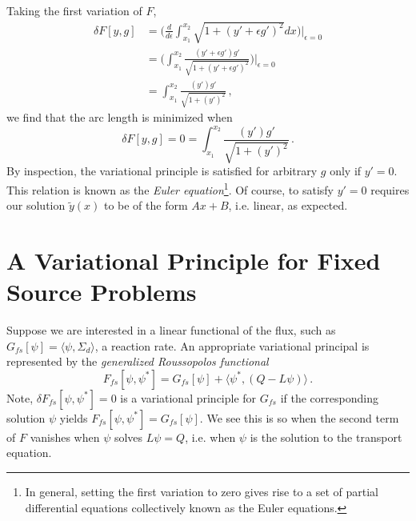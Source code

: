 Taking the first variation of $F$,
\begin{equation}
\begin{split}
\delta F[y,g] &= \Big ( \frac{d}{d\epsilon}\int^{x_2}_{x_1} \sqrt{1 + (y'+\epsilon g')^2} dx  \Big ) \Big |_{\epsilon=0} \\
              &=  \Bigg ( \int^{x_2}_{x_1} \frac{(y'+\epsilon g')g'}{\sqrt{1 + (y'+\epsilon g')^2}}  \Bigg ) \Bigg |_{\epsilon=0} \\
              &= \int^{x_2}_{x_1} \frac{(y')g'}{\sqrt{1 + (y')^2}}  \, ,
\end{split}
\end{equation}
we find that the arc length is minimized when
\begin{equation}
\delta F[y,g] = 0 =  \int^{x_2}_{x_1} \frac{(y')g'}{\sqrt{1 + (y')^2}}  \, .
\label{eq:exampleprinciple}
\end{equation}
By inspection, the variational principle is satisfied for arbitrary $g$ only if $y' = 0$.  This relation is known as the \textit{Euler equation}\footnote{In general, setting the first variation to zero gives rise to a set of partial differential equations collectively known as the Euler equations.}.  Of course, to satisfy $y'=0$ requires our solution $\tilde{y}(x)$ to be of the form $Ax+B$, i.e. linear, as expected.

\section*{A Variational Principle for Fixed Source Problems}

Suppose we are interested in a linear functional of the flux, such as $G_{fs}[\psi] = \langle \psi, \Sigma_d \rangle$, a reaction rate. An appropriate variational principal is represented by the \textit{generalized Roussopolos functional}
\begin{equation}
 F_{fs} [\psi,\psi^*] = G_{fs}[\psi] + \langle \psi^*, (Q-L\psi) \rangle \, .
\end{equation}
Note, $\delta F_{fs}[\psi,\psi^*] = 0$ is a variational principle for $G_{fs}$ if the corresponding solution $\psi$ yields $F_{fs}[\psi,\psi^*] = G_{fs}[\psi]$.  We see this is so when the second term of $F$ vanishes when $\psi$ solves $L\psi = Q$, i.e. when $\psi$ is the solution to the transport equation.

